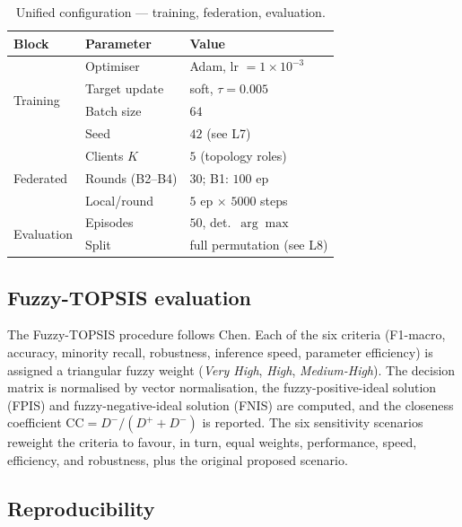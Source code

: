 \documentclass[ai,article,submit,moreauthors,pdftex]{Definitions/mdpi}
\newcommand{\rev}[1]{#1}
\begin{document}
\rev{\begin{table}[!htbp]
\centering
\caption{Unified configuration --- training, federation, evaluation.}\label{tab:config_train}
\footnotesize
\setlength{\tabcolsep}{4pt}
\begin{tabular}{@{}lll@{}}
\toprule
\textbf{Block} & \textbf{Parameter} & \textbf{Value} \\
\midrule
\multirow{4}{*}{Training}
  & Optimiser                 & Adam, lr $=1{\times}10^{-3}$ \\
  & Target update             & soft, $\tau = 0.005$ \\
  & Batch size                & $64$ \\
  & Seed                      & $42$ (see L7) \\
\midrule
\multirow{3}{*}{Federated}
  & Clients $K$               & $5$ (topology roles) \\
  & Rounds (B2--B4)           & $30$; B1: $100$ ep \\
  & Local/round               & $5$ ep $\times$ $5000$ steps \\
\midrule
\multirow{2}{*}{Evaluation}
  & Episodes                  & $50$, det.\ $\arg\max$ \\
  & Split                     & full permutation (see L8) \\
\bottomrule
\end{tabular}
\end{table}}

\subsection{Fuzzy-TOPSIS evaluation}\label{sec:methods_topsis}

The Fuzzy-TOPSIS procedure follows Chen\cite{chen2000extensions}. Each
of the six criteria (F1-macro, accuracy, minority recall, robustness,
inference speed, parameter efficiency) is assigned a triangular fuzzy
weight (\emph{Very High}, \emph{High}, \emph{Medium-High}). The decision
matrix is normalised by vector normalisation, the fuzzy-positive-ideal
solution (FPIS) and fuzzy-negative-ideal solution (FNIS) are computed,
and the closeness coefficient
$\text{CC} = D^{-}/(D^{+} + D^{-})$ is reported. The six sensitivity
scenarios reweight the criteria to favour, in turn, equal weights,
performance, speed, efficiency, and robustness, plus the original
proposed scenario.

\subsection{Reproducibility}\label{sec:methods_repro}
\end{document}
